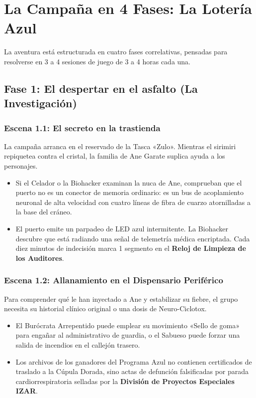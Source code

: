 \chapter{La Campaña en 4 Fases: La Lotería Azul}

La aventura está estructurada en cuatro fases correlativas, pensadas para resolverse en 3 a 4 sesiones de juego de 3 a 4 horas cada una.

\section{Fase 1: El despertar en el asfalto (La Investigación)}

\subsection{Escena 1.1: El secreto en la trastienda}
La campaña arranca en el reservado de la Tasca «Zulo». Mientras el sirimiri repiquetea contra el cristal, la familia de Ane Garate suplica ayuda a los personajes.
\begin{itemize}
  \item {} Si el Celador o la Biohacker examinan la nuca de Ane, comprueban que el puerto no es un conector de memoria ordinario: es un bus de acoplamiento neuronal de alta velocidad con cuatro líneas de fibra de cuarzo atornilladas a la base del cráneo.
  \item {} El puerto emite un parpadeo de LED azul intermitente. La Biohacker descubre que está radiando una señal de telemetría médica encriptada. Cada diez minutos de indecisión marca 1 segmento en el \textbf{Reloj de Limpieza de los Auditores}.
\end{itemize}

\subsection{Escena 1.2: Allanamiento en el Dispensario Periférico}
Para comprender qué le han inyectado a Ane y estabilizar su fiebre, el grupo necesita su historial clínico original o una dosis de Neuro-Ciclotox.
\begin{itemize}
  \item {} El Burócrata Arrepentido puede emplear su movimiento «Sello de goma» para engañar al administrativo de guardia, o el Sabueso puede forzar una salida de incendios en el callejón trasero.
  \item {} Los archivos de los ganadores del Programa Azul no contienen certificados de traslado a la Cúpula Dorada, sino actas de defunción falsificadas por parada cardiorrespiratoria selladas por la \textbf{División de Proyectos Especiales IZAR}.
\end{itemize}

